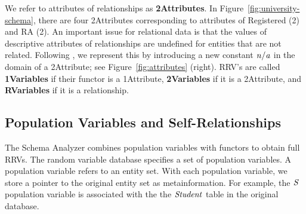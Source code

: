 \documentclass{acm_proc_article-sp}
\begin{document}
We refer to attributes of relationships as \textbf{2Attributes}. In Figure~\ref{fig:university-schema}, there are four 2Attributes corresponding to attributes of Registered (2) and RA (2). An important issue for relational data is that the values of descriptive attributes of relationships are undefined for entities that are not related. Following \cite{Russell2010}, we represent this by introducing a new constant $\it{n/a}$ in the domain of a 2Attribute; see Figure~\ref{fig:attributes} (right). RRV's are called \textbf{1Variables} if their functor is a 1Attribute, \textbf{2Variables} if it is a 2Attribute, and \textbf{RVariables} if it is a relationship.



\subsection{Population Variables and Self-Relationships} \label{sec:pvariables}

The Schema Analyzer combines population variables with functors to obtain full RRVs. The random variable database specifies a set of population variables. A population variable refers to an entity set. With each population variable, we store a pointer to the original entity set as metainformation. For example, the $\it{S}$ population variable is associated with the the $\it{Student}$ table in the original database. 
\end{document}
